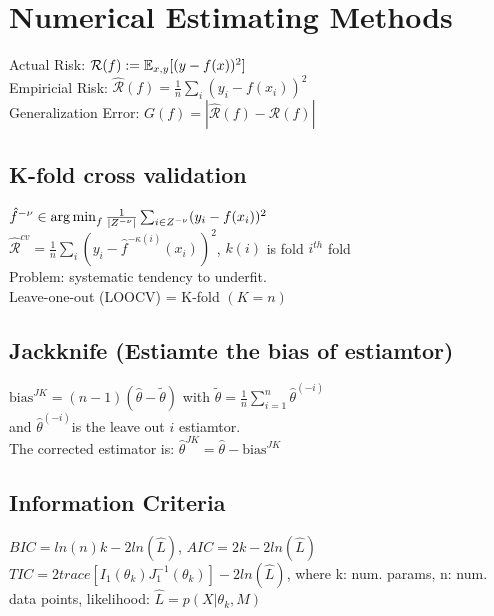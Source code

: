 \section{Numerical Estimating Methods}
Actual Risk: $\mathcal{R}(f) := \mathbb{E}_{x,y}[(y-f(x))^2]$ \\
Empiricial Risk: $\hat{\mathcal{R}}(f) = \frac{1}{n}\sum_i (y_i - f(x_i))^2$\\
Generalization Error: $G(f) = |\hat{\mathcal{R}}(f) - \mathcal{R}(f)|$
\subsection*{K-fold cross validation}
$\hat{f}^{-\nu} \in \operatorname*{arg\,min}_f \frac{1}{|Z^{-\nu}|} \sum_{i \in Z^{-\nu}} (y_i - f(x_i))^2$\\
$\hat{\mathcal{R}}^{cv} = \frac{1}{n} \sum_i(y_i - \hat{f}^{-\kappa(i)}(x_i))^2$, $k(i)$ is fold $i^{th}$ fold \\
Problem: systematic tendency to underfit.\\
Leave-one-out (LOOCV) = K-fold $(K=n)$

\subsection*{Jackknife (Estiamte the bias of estiamtor)}
$\text{bias}^{JK} = (n-1)(\hat\theta - \tilde{\theta})$ with
$\tilde{\theta}=\frac{1}{n}\sum_{i=1}^n\hat{\theta}^{(-i)}$\\
and $\hat{\theta}^{(-i)}$is the leave out $i$ estiamtor.\\
The corrected estimator is: $\hat{\theta}^{JK} = \hat{\theta} - \text{bias}^{JK}$
\subsection*{Information Criteria}
$BIC = ln(n)k - 2ln(\hat{L})$, $AIC = 2k - 2ln(\hat{L})$\\
$TIC = 2trace[I_1(\theta_k)J_1^{-1}(\theta_k)] - 2ln(\hat{L})$, 
where k: num. params, n: num. data points, likelihood: $\hat{L}=p(X|\theta_k,M)$  
